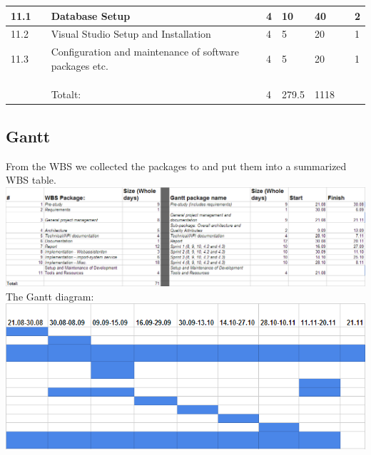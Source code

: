 \begin{longtable}{|p{0.7cm}|p{3cm}|p{2cm}|p{2cm}|p{2cm}|p{2cm}|p{2cm}|p{2cm}|}
\hline
11.1 &  & Database Setup & 4 & 10 & 40 &  & 2\\ 
\hline
11.2 &  & Visual Studio Setup and Installation & 4 & 5 & 20 &  & 1\\ 
\hline
11.3 &  & Configuration and maintenance of software packages etc. & 4 & 5 & 20 &  & 1\\ 
\hline
 &  &  &  &  &  &  & \\ 
\hline
 &  &  &  &  &  &  & \\ 
\hline
 &  &  &  &  &  &  & \\ 
\hline
 &  & Totalt: & 4 & 279.5 & 1118 &  & \\
\hline %

\end{longtable}
\subsection{Gantt}
From the WBS we collected the packages to and put them into a summarized WBS table.
\hspace{-1.7cm}\includegraphics[width=1.3\textwidth]{images/gantt01.png}\\
The Gantt diagram:\\
\includegraphics[width=1\textwidth]{images/gantt02.png}


